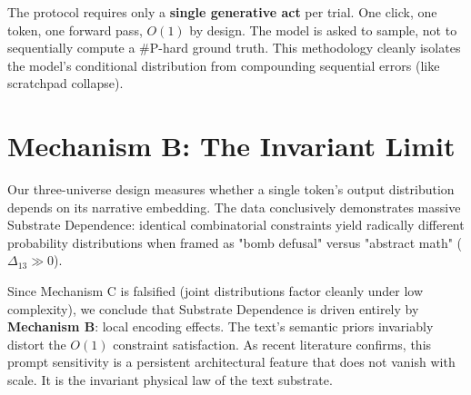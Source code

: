 \documentclass[12pt,a4paper]{article}
\begin{document}
The protocol requires only a \textbf{single generative act} per trial. One click, one token, one forward pass, $O(1)$ by design. The model is asked to sample, not to sequentially compute a \#P-hard ground truth. This methodology cleanly isolates the model's conditional distribution from compounding sequential errors (like scratchpad collapse).

\section{Mechanism B: The Invariant Limit}

Our three-universe design measures whether a single token's output distribution depends on its narrative embedding.
The data conclusively demonstrates massive Substrate Dependence: identical combinatorial constraints yield radically different probability distributions when framed as "bomb defusal" versus "abstract math" ($\Delta_{13} \gg 0$).

Since Mechanism C is falsified (joint distributions factor cleanly under low complexity), we conclude that Substrate Dependence is driven entirely by \textbf{Mechanism B}: local encoding effects. The text's semantic priors invariably distort the $O(1)$ constraint satisfaction. As recent literature confirms, this prompt sensitivity is a persistent architectural feature that does not vanish with scale. It is the invariant physical law of the text substrate.
\end{document}
